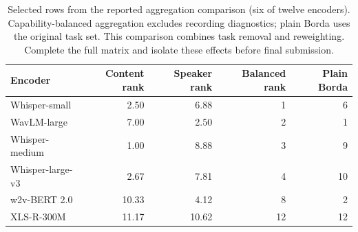 \begin{table}[htbp]
\centering\small
\begin{tabular}{lrrrr}\toprule
Encoder & Content rank & Speaker rank & Balanced rank & Plain Borda \\\midrule
Whisper-small & 2.50 & 6.88 & 1 & 6 \\
WavLM-large & 7.00 & 2.50 & 2 & 1 \\
Whisper-medium & 1.00 & 8.88 & 3 & 9 \\
Whisper-large-v3 & 2.67 & 7.81 & 4 & 10 \\
w2v-BERT 2.0 & 10.33 & 4.12 & 8 & 2 \\
XLS-R-300M & 11.17 & 10.62 & 12 & 12 \\
\bottomrule\end{tabular}
\caption{Selected rows from the reported aggregation comparison (six of twelve encoders). Capability-balanced aggregation excludes recording diagnostics; plain Borda uses the original task set. This comparison combines task removal and reweighting. Complete the full matrix and isolate these effects before final submission.}
\label{tab:aggregation}\end{table}
